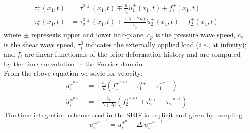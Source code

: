 \begin{equation}
\begin{split}
\tau_1^\pm(x_1,t)&=\tau_1^{0\pm} (x_1,t)\mp\frac{\mu}{c_s}            \dot{u}_1^\pm(x_1,t) +f_1^\pm(x_1,t) \\
\tau_2^\pm(x_1,t)&=\tau_2^{0\pm} (x_1,t)\mp\frac{(\lambda+2\mu)}{c_p} \dot{u}_2^\pm(x_1,t) +f_2^\pm(x_1,t)
\label{eq:SBI_trac}
\end{split}
\end{equation}
where $\pm$ represents upper and lower half-plane, $c_p$ is the pressure wave speed, $c_s$ is the shear wave speed, $\tau_i^0$ indicates the externally applied load (\textit{i.e.}, at infinity); and $f_i$ are linear functionals of the prior deformation history and are computed by the time convolution in the Fourier domain\\
From the above equation we sovle for velocity:
\begin{equation}\label{eq:SBI_velocity}
\begin{split}
\dot{u}_1^{\pm^{n+1}} &= \pm \frac{c_s}{\mu}( f_1^{\pm^{n+1}}+\tau_1^{0\pm}- \tau_1^{\pm^{n+1}} ) \\
\dot{u}_2^{\pm^{n+1}} &= \pm \frac{c_p}{\lambda + 2 \mu} ( f_2^{\pm^{n+1}} + \tau_2^{0\pm} - \tau_2^{\pm^{n+1}} )
\end{split}
\end{equation}
The time integration scheme used in the SBIE is explicit and given by sampling
\begin{equation}
u_i^{\pm{n+1}} = u_i^{\pm^n} + \Delta t \dot{u}_i^{\pm{n+1}} \label{eq:SBI_update_disp}
\end{equation}

